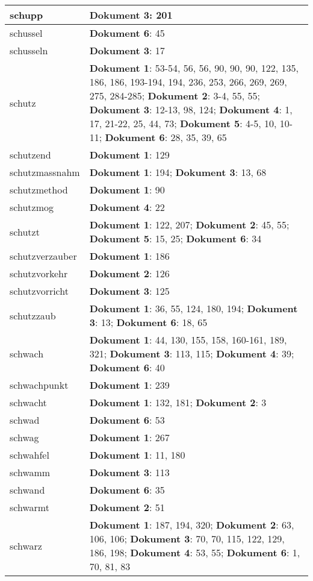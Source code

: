 \documentclass[a5paper]{article}
\begin{document}
\begin{longtable}[l]{|l|p{3in}|}
\hline
schupp & \textbf{Dokument 3}: 201 \\
\hline
schussel & \textbf{Dokument 6}: 45 \\
\hline
schusseln & \textbf{Dokument 3}: 17 \\
\hline
schutz & \textbf{Dokument 1}: 53-54, 56, 56, 90, 90, 90, 122, 135, 186, 186, 193-194, 194, 236, 253, 266, 269, 269, 275, 284-285; \textbf{Dokument 2}: 3-4, 55, 55; \textbf{Dokument 3}: 12-13, 98, 124; \textbf{Dokument 4}: 1, 17, 21-22, 25, 44, 73; \textbf{Dokument 5}: 4-5, 10, 10-11; \textbf{Dokument 6}: 28, 35, 39, 65 \\
\hline
schutzend & \textbf{Dokument 1}: 129 \\
\hline
schutzmassnahm & \textbf{Dokument 1}: 194; \textbf{Dokument 3}: 13, 68 \\
\hline
schutzmethod & \textbf{Dokument 1}: 90 \\
\hline
schutzmog & \textbf{Dokument 4}: 22 \\
\hline
schutzt & \textbf{Dokument 1}: 122, 207; \textbf{Dokument 2}: 45, 55; \textbf{Dokument 5}: 15, 25; \textbf{Dokument 6}: 34 \\
\hline
schutzverzauber & \textbf{Dokument 1}: 186 \\
\hline
schutzvorkehr & \textbf{Dokument 2}: 126 \\
\hline
schutzvorricht & \textbf{Dokument 3}: 125 \\
\hline
schutzzaub & \textbf{Dokument 1}: 36, 55, 124, 180, 194; \textbf{Dokument 3}: 13; \textbf{Dokument 6}: 18, 65 \\
\hline
schwach & \textbf{Dokument 1}: 44, 130, 155, 158, 160-161, 189, 321; \textbf{Dokument 3}: 113, 115; \textbf{Dokument 4}: 39; \textbf{Dokument 6}: 40 \\
\hline
schwachpunkt & \textbf{Dokument 1}: 239 \\
\hline
schwacht & \textbf{Dokument 1}: 132, 181; \textbf{Dokument 2}: 3 \\
\hline
schwad & \textbf{Dokument 6}: 53 \\
\hline
schwag & \textbf{Dokument 1}: 267 \\
\hline
schwahfel & \textbf{Dokument 1}: 11, 180 \\
\hline
schwamm & \textbf{Dokument 3}: 113 \\
\hline
schwand & \textbf{Dokument 6}: 35 \\
\hline
schwarmt & \textbf{Dokument 2}: 51 \\
\hline
schwarz & \textbf{Dokument 1}: 187, 194, 320; \textbf{Dokument 2}: 63, 106, 106; \textbf{Dokument 3}: 70, 70, 115, 122, 129, 186, 198; \textbf{Dokument 4}: 53, 55; \textbf{Dokument 6}: 1, 70, 81, 83 \\

\end{longtable}
\end{document}
